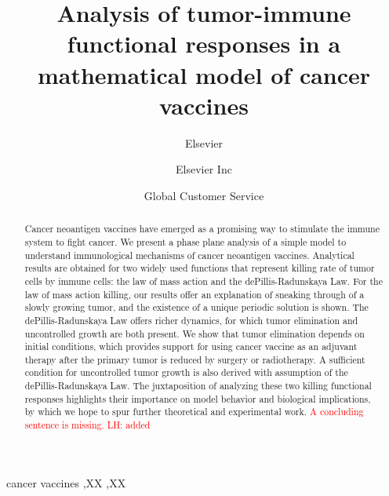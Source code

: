 \documentclass[review,authoryear]{elsarticle}
\newcommand{\red}[1]{\textcolor{red}{#1}}
\begin{document}
\begin{frontmatter}

\title{Analysis of tumor-immune functional responses in a mathematical model
of cancer vaccines}


\author{Elsevier}
\address{Radarweg 29, Amsterdam}

\author[mymainaddress,mysecondaryaddress]{Elsevier Inc}

\author[mysecondaryaddress]{Global Customer Service}

\address[mymainaddress]{1600 John F Kennedy Boulevard, Philadelphia}
\address[mysecondaryaddress]{360 Park Avenue South, New York}

\begin{abstract}
Cancer neoantigen vaccines have emerged as a promising way to stimulate
the immune system to fight cancer. We present a phase plane analysis
of a simple model to understand immunological mechanisms of
cancer neoantigen vaccines. Analytical results are obtained for
two widely used functions that represent killing rate of tumor cells by immune cells:
the law of mass action and the dePillis-Radunskaya Law. For the law
of mass action killing, our results offer an
explanation of sneaking through of a slowly growing tumor, and
the existence of a unique periodic solution is shown. The dePillis-Radunskaya
Law offers richer dynamics, for which tumor elimination and uncontrolled growth are both present. We show that tumor elimination depends
on initial conditions, which provides support for using cancer vaccine
as an adjuvant therapy after the primary tumor is reduced by surgery
or radiotherapy. A sufficient condition for uncontrolled tumor growth 
is also derived with assumption of the dePillis-Radunskaya Law. The juxtaposition of analyzing these two killing functional responses highlights their importance on model behavior and biological implications, by which we hope to spur further theoretical and experimental work.  \red{A concluding sentence is missing. LH: added}
\end{abstract}

\begin{keyword}
cancer vaccines \sep XX \sep XX
\end{keyword}

\end{frontmatter}
\end{document}
